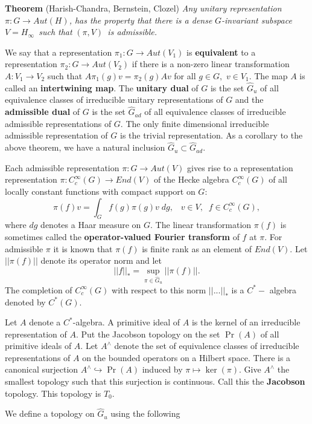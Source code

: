 {\bf Theorem} (Harish-Chandra, Bernstein, Clozel) {\em Any unitary
representation }$\pi :G\rightarrow Aut(H)${\em , has the property that there
is a dense }$G${\em -invariant subspace }$V=H_\infty ${\em \ such that }$%
(\pi ,V)${\em \ is admissible.}

We say that a representation $\pi _1:G\rightarrow Aut(V_1)$ is {\bf %
equivalent} to a representation $\pi _2:G\rightarrow Aut(V_2)$ if there is a
non-zero linear transformation $A:V_1\rightarrow V_2$ such that $A\pi
_1(g)v=\pi _2(g)Av$ for all $g\in G,$ $v\in V_1.$ The map $A$ is called an 
{\bf intertwining map}. The {\bf unitary dual} of $G$ is the set $\hat G_u$
of all equivalence classes of irreducible unitary representations of $G$ and
the {\bf admissible dual} of $G$ is the set $\hat G_{ad}$ of all equivalence
classes of irreducible admissible representations of $G.$ The only finite
dimensional irreducible admissible representation of $G$ is the trivial
representation. As a corollary to the above theorem, we have a natural
inclusion $\hat G_u\subset \hat G_{ad}.$

Each admissible representation $\pi :G\rightarrow Aut(V)$ gives rise to a
representation representation $\pi :C_c^\infty (G)\rightarrow End(V)$ of the
Hecke algebra $C_c^\infty (G)$ of all locally constant functions with
compact support on $G$: 
\[
\pi (f)v=\int_Gf(g)\pi (g)v\;dg,\;\;\;v\in V,\;\;f\in C_c^\infty (G), 
\]
where $dg$ denotes a Haar measure on $G$. The linear transformation $\pi (f)$
is sometimes called the {\bf operator-valued Fourier transform} of $f$ at $%
\pi .$ For admissible $\pi $ it is known that $\pi (f)$ is finite rank as an
element of $End(V)$. Let $||\pi (f)||$ denote its operator norm and let 
\[
||f||_{*}=\sup_{\pi \in \hat G_u}||\pi (f)||. 
\]
The completion of $C_c^\infty (G)$ with respect to this norm $||...||_{*}$
is a $C^{*}-$ algebra denoted by $C^{*}(G)$.

Let $A$ denote a $C^{*}$-algebra. A primitive ideal of $A$ is the kernel of
an irreducible representation of $A$. Put the Jacobson topology on the set $%
\Pr (A)$ of all primitive ideals of $A$. Let $A^{\wedge }$ denote the set of
equivalence classes of irreducible representations of $A$ on the bounded
operators on a Hilbert space. There is a canonical surjection $A^{\wedge
}\hookrightarrow \Pr (A)$ induced by $\pi \longmapsto \ker (\pi ).$ Give $%
A^{\wedge }$ the smallest topology such that this surjection is continuous.
Call this the {\bf Jacobson} topology. This topology is $T_0$.

We define a topology on $\hat G_u$ using the following

